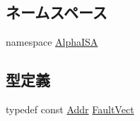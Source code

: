 \subsection*{ネームスペース}
\begin{DoxyCompactItemize}
\item 
namespace \hyperlink{namespaceAlphaISA}{AlphaISA}
\end{DoxyCompactItemize}
\subsection*{型定義}
\begin{DoxyCompactItemize}
\item 
typedef const \hyperlink{base_2types_8hh_af1bb03d6a4ee096394a6749f0a169232}{Addr} \hyperlink{namespaceAlphaISA_a5c26c9764cc05486454998efadf79833}{FaultVect}
\end{DoxyCompactItemize}
